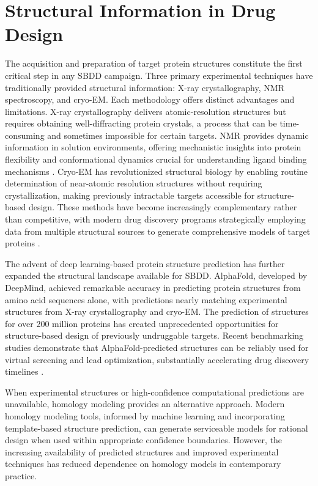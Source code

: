 \documentclass[12pt,a4paper]{article}
\begin{document}
\section*{Structural Information in Drug Design}

The acquisition and preparation of target protein structures constitute the first critical step in any SBDD campaign. Three primary experimental techniques have traditionally provided structural information: X-ray crystallography, NMR spectroscopy, and cryo-EM. Each methodology offers distinct advantages and limitations. X-ray crystallography delivers atomic-resolution structures but requires obtaining well-diffracting protein crystals, a process that can be time-consuming and sometimes impossible for certain targets. NMR provides dynamic information in solution environments, offering mechanistic insights into protein flexibility and conformational dynamics crucial for understanding ligand binding mechanisms \citep{Shimada2018}. Cryo-EM has revolutionized structural biology by enabling routine determination of near-atomic resolution structures without requiring crystallization, making previously intractable targets accessible for structure-based design. These methods have become increasingly complementary rather than competitive, with modern drug discovery programs strategically employing data from multiple structural sources to generate comprehensive models of target proteins \citep{Scapin2018,Liao2020}.

The advent of deep learning-based protein structure prediction has further expanded the structural landscape available for SBDD. AlphaFold, developed by DeepMind, achieved remarkable accuracy in predicting protein structures from amino acid sequences alone, with predictions nearly matching experimental structures from X-ray crystallography and cryo-EM. The prediction of structures for over 200 million proteins has created unprecedented opportunities for structure-based design of previously undruggable targets. Recent benchmarking studies demonstrate that AlphaFold-predicted structures can be reliably used for virtual screening and lead optimization, substantially accelerating drug discovery timelines \citep{Jumper2021,Tunyasuvunakool2021,Schaarschmidt2022}.

When experimental structures or high-confidence computational predictions are unavailable, homology modeling provides an alternative approach. Modern homology modeling tools, informed by machine learning and incorporating template-based structure prediction, can generate serviceable models for rational design when used within appropriate confidence boundaries. However, the increasing availability of predicted structures and improved experimental techniques has reduced dependence on homology models in contemporary practice.
\end{document}
